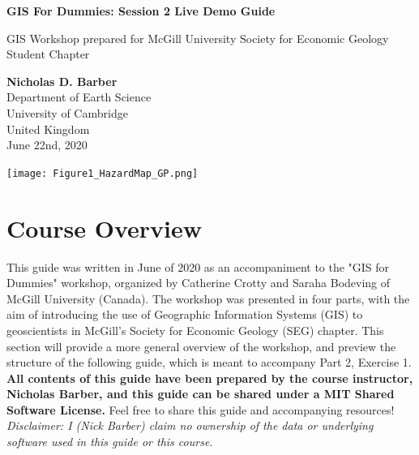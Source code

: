 \documentclass{article}
\begin{document}
\begin{titlepage}
   \begin{center}
       \vspace*{1cm}

       \LARGE
       \textbf{GIS For Dummies: Session 2 Live Demo Guide}
       
       \Large
       \vspace{0.3cm}
        GIS Workshop prepared for McGill University Society for Economic Geology Student Chapter
            
       \vspace{1.2cm}
       \textbf{Nicholas D. Barber}\\
       Department of Earth Science\\
       University of Cambridge\\
       United Kingdom\\
       June 22nd, 2020
            
       \vspace{0.8cm}
     
       \texttt{[image: Figure1\_HazardMap\_GP.png]}
   \end{center}
\end{titlepage}

\tableofcontents

\section{Course Overview}

This guide was written in June of 2020 as an accompaniment to the "GIS for Dummies" workshop, organized by Catherine Crotty and Saraha Bodeving of McGill University (Canada). The workshop was presented in four parts, with the aim of introducing the use of Geographic Information Systems (GIS) to geoscientists in McGill's Society for Economic Geology (SEG) chapter. This section will provide a more general overview of the workshop, and preview the structure of the following guide, which is meant to accompany Part 2, Exercise 1. \textbf{All contents of this guide have been prepared by the course instructor, Nicholas Barber, and this guide can be shared under a MIT Shared Software License.} Feel free to share this guide and accompanying resources! \textit{Disclaimer: I (Nick Barber) claim no ownership of the data or underlying software used in this guide or this course.} 
\end{document}
